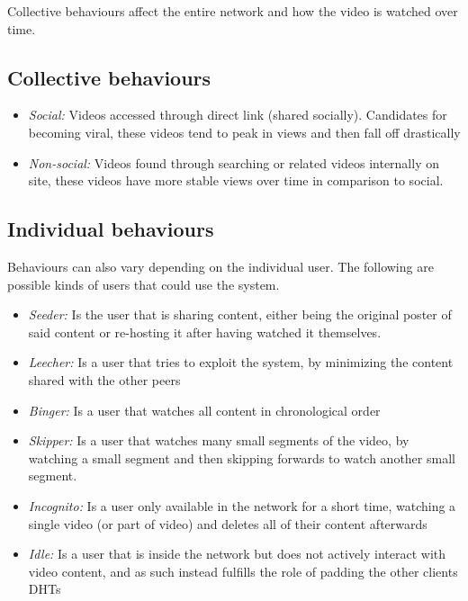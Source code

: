 Collective behaviours affect the entire network and how the video is watched over time.
\subsection{Collective behaviours}
\begin{itemize}
    \item \textit{Social:}
    Videos accessed through direct link (shared socially). Candidates for becoming viral, these videos tend to peak in views and then fall off drastically
    \item \textit{Non-social:}
    Videos found through searching or related videos internally on site, these videos have more stable views over time in comparison to social.
\end{itemize}

\subsection{Individual behaviours}
\label{sec:individual-behavious}
Behaviours can also vary depending on the individual user. The following are possible kinds of users that could use the system.
\begin{itemize}
    \item \textit{Seeder:}
    Is the user that is sharing content, either being the original poster of said content or re-hosting it after having watched it themselves.
    \item \textit{Leecher:}
    Is a user that tries to exploit the system, by minimizing the content shared with the other peers %
    \item \textit{Binger:}
    Is a user that watches all content in chronological order
    \item \textit{Skipper:}
    Is a user that watches many small segments of the video, by watching a small segment and then skipping forwards to watch another small segment.
    \item \textit{Incognito:}
    Is a user only available in the network for a short time, watching a single video (or part of video) and deletes all of their content afterwards
    \item \textit{Idle:}
    Is a user that is inside the network but does not actively interact with video content, and as such instead fulfills the role of padding the other clients \acp{DHT}
\end{itemize}

